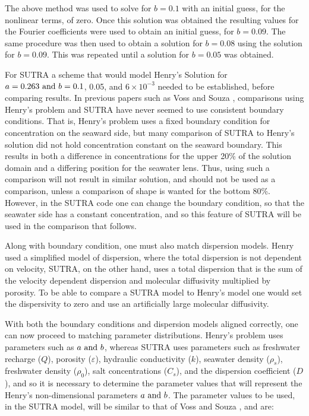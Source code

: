 The above method was used to solve for $b=0.1$ with an initial guess, for the nonlinear terms, of
zero. Once this solution was obtained the resulting values for the Fourier coefficients were used to
obtain an initial guess, for $b=0.09$. The same procedure was then used to obtain a solution for
$b=0.08$ using the solution for $b=0.09$. This was repeated until a solution for $b=0.05$ was
obtained.

For SUTRA a scheme that would model Henry's Solution for $a=0.263 \text{ and } b=0.1$, 0.05, and
$6\times 10^{-3} $ needed to be established, before comparing results. In previous papers such as
Voss and Souza \cite{Voss}, comparisons using Henry's problem and SUTRA have never seemed to use
consistent boundary conditions. That is, Henry's problem uses a fixed boundary condition for
concentration on the seaward side, but many comparison of SUTRA to Henry's solution did not hold
concentration constant on the seaward boundary. This results in both a difference in concentrations
for the upper 20\% of the solution domain and a differing position for the seawater lens. Thus,
using such a comparison will not result in similar solution, and should not be used as a comparison,
unless a comparison of shape is wanted for the bottom 80\%.  However, in the SUTRA code one can
change the boundary condition, so that the seawater side has a constant concentration, and so this
feature of SUTRA will be used in the comparison that follows.

Along with boundary condition, one must also match dispersion models. Henry used a simplified model
of dispersion, where the total dispersion is not dependent on velocity, SUTRA, on the other hand,
uses a total dispersion that is the sum of the velocity dependent dispersion and molecular
diffusivity multiplied by porosity. To be able to compare a SUTRA model to Henry's model one would
set the dispersivity to zero and use an artificially large molecular diffusivity. 

With both the boundary conditions and dispersion models aligned correctly, one can now proceed to
matching parameter distributions. Henry's problem uses parameters such as $a \text{ and } b$, whereas
SUTRA uses parameters such as freshwater recharge ($Q$), porosity ($\varepsilon $), hydraulic
conductivity ($k$), seawater density ($\rho _{s}$), freshwater density ($\rho _{0}$), salt
concentrations ($C_{s}$), and the dispersion coefficient ($D$), and so it is necessary to determine
the parameter values that will represent the Henry's non-dimensional parameters $a \text{ and } b$.
The parameter values to be used, in the SUTRA model, will be similar to that of Voss and Souza
\cite{Voss}, and are:

